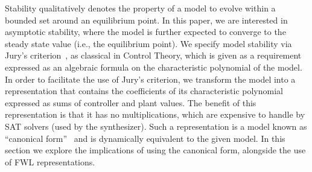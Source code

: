 \documentclass[a4paper,UKenglish]{lipics-v2018}
\begin{document}
Stability qualitatively denotes the property of a model to evolve within a
bounded set around an equilibrium point.  In this paper, we are interested
in asymptotic stability, where the model is further expected to converge to
the steady state value (i.e., the equilibrium point).
%
We specify model stability via Jury's criterion~\cite{fadali}, 
as classical in Control Theory,  %
which is given as a requirement expressed as an algebraic formula on the
characteristic polynomial of the model.  In order to facilitate the use of
Jury's criterion, we transform the model into a representation that contains
the coefficients of its characteristic polynomial expressed as sums of
controller and plant values.  The benefit of this representation is that it
has no multiplications, which are expensive to handle by SAT solvers (used
by the synthesizer).
%
Such a representation is a model known as 
``canonical form''~\cite{Astrom08} %
and is dynamically equivalent to the given model.  
In this section we explore the implications of using the canonical form, 
alongside the use of FWL representations.  

\medskip
\end{document}
